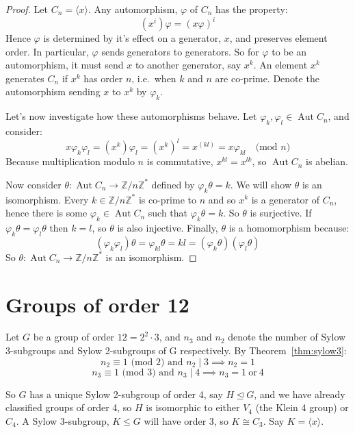 \documentclass[a4paper, oneside, 12pt, final]{article}
\theoremstyle{definition}
\DeclareMathOperator{\Aut}{Aut}
\newcommand{\Z}{\mathbb{Z}}
\newcommand{\Zn}[1]{\Z/#1\Z}
\begin{document}
\begin{proof}
    Let \(C_n = \langle x \rangle\).
    Any automorphism, \(\varphi\) of \(C_n\) has the property:
    \[(x^i)\varphi = {(x\varphi)}^i\]
    Hence \(\varphi\) is determined by it's effect on a generator, \(x\), and preserves element
    order.
    In particular, \(\varphi\) sends generators to generators.
    So for \(\varphi\) to be an automorphism, it must send \(x\) to another generator, say \(x^k\).
    An element \(x^k\) generates \(C_n\) if \(x^k\) has order \(n\), i.e.\ when \(k\) and \(n\) are co-prime.
    Denote the automorphism sending \(x\) to \(x^k\) by \(\varphi_k\).

    Let's now investigate how these automorphisms behave.
    Let \(\varphi_k, \varphi_l \in \Aut{C_n}\), and consider:
    \[x\varphi_k\varphi_l = (x^k)\varphi_l = {(x^k)}^l = x^{(kl)} = x\varphi_{kl} \quad \text{(mod \(n\))}\]
    Because multiplication modulo \(n\) is commutative, \(x^{kl} = x^{lk}\), so \(\Aut{C_n}\) is abelian.

    Now consider \(\theta:\Aut{C_n} \to \Zn{n}^*\) defined by \(\varphi_k\theta = k\).
    We will show \(\theta\) is an isomorphism.
    Every \(k \in \Zn{n}^*\) is co-prime to \(n\) and so \(x^k\) is a generator of \(C_n\), hence there is some \(\varphi_k
    \in \Aut{C_n}\) such that \(\varphi_k\theta = k\).
    So \(\theta\) is surjective.
    If \(\varphi_k\theta = \varphi_l\theta\) then \(k = l\), so \(\theta\) is also injective.
    Finally, \(\theta\) is a homomorphism because:
    \[(\varphi_k\varphi_l)\theta = \varphi_{kl}\theta = kl = (\varphi_k\theta)(\varphi_l\theta)\]
    So \(\theta:\Aut{C_n} \to \Zn{n}^*\) is an isomorphism.
\end{proof}



\section{Groups of order 12}
Let \(G\) be a group of order \(12 = 2^2 \cdot 3\), and \(n_3\) and \(n_2\) denote the number of Sylow 3-subgroups and
Sylow 2-subgroups of G respectively.
By Theorem~\ref{thm:sylow3}:
\[n_2 \equiv 1 \text{ (mod 2) and } n_2 \mid 3 \implies n_2 = 1\]
\[n_3 \equiv 1 \text{ (mod 3) and } n_3 \mid 4 \implies n_3 = 1 \ \text{or} \ 4\]

So \(G\) has a unique Sylow 2-subgroup of order 4, say \(H \unlhd G\), and we have already classified groups of order 4,
so \(H\) is isomorphic to either \(V_4\) (the Klein 4 group) or \(C_4\).
A Sylow 3-subgroup, \(K \leqslant G\) will have order 3, so \(K \cong C_3\).
Say \(K = \langle x \rangle\).
\end{document}
